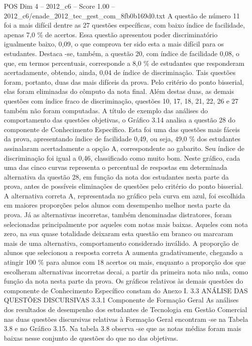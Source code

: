 \begin{textsample}{POS Dim 4 – 2012\_c6 – Score 1.00 – 2012\_c6/enade\_2012\_tec\_gest\_com\_8fb0b169d0.txt}
A questão de número 11 foi a mais difícil dentre as 27 questões específicas, com baixo índice de facilidade, apenas 7,0 \% de acertos.
Essa questão apresentou poder discriminatório igualmente baixo, 0,09, o que comprova ter sido esta a mais difícil para os estudantes.
Destaca -se, também, a questão 20, com índice de facilidade 0,08, o que, em termos percentuais, corresponde a 8,0 \% de estudantes que responderam acertadamente, obtendo, ainda, 0,04 de índice de discriminação.
Tais questões foram, portanto, duas das mais difíceis da prova.
Pelo critério do ponto bisserial, elas foram eliminadas do cômputo da nota final.
Além destas duas, as demais questões com índice fraco de discriminação, questões 10, 17, 18, 21, 22, 26 e 27 também não foram computadas.
A título de exemplo das análises do comportamento das questões objetivas, o Gráfico 3.14 analisa a questão 28 do componente de Conhecimento Específico.
Esta foi uma das questões mais fáceis da prova, apresentando índice de facilidade 0,49, ou seja, 49,0 \% dos estudantes assinalaram acertadamente a opção A, correspondente ao gabarito.
Seu índice de discriminação foi igual a 0,46, classificado como muito bom.
Neste gráfico, cada uma das cinco curvas representa o percentual de respostas em determinada alternativa da questão 28, em função da nota dos estudantes nesta parte da prova, antes de possíveis eliminações de questões pelo critério do ponto bisserial.
A alternativa correta A, representada no gráfico pela curva em azul, foi escolhida em maiores proporções pelos alunos com desempenho melhor nesta parte da prova.
Já as alternativas incorretas, também denominadas distratores, foram selecionadas principalmente por aqueles com notas mais baixas.
Aqueles com nota zero, na sua quase totalidade deixaram esta questão em branco ou marcaram mais de uma alternativa, comportamento considerado inválido.
A proporção de alunos que selecionou a resposta correta A aumenta gradativamente, chegando a atingir 100 \% para alunos com 18 acertos ou mais, enquanto a proporção dos que escolheram alternativas incorretas decai, a partir da primeira nota não nula, como função da nota nesta parte da prova.
Os gráficos relativos às demais questões do componente de Conhecimento Específico constam do Anexo I. 3.3 ANÁLISE DAS QUESTÕES DISCURSIVAS 3.3.1 Componente de Formação Geral As análises dos resultados de desempenho dos estudantes de Tecnologia em Gestão Comercial nas duas questões discursivas relativas à Formação Geral encontram -se na Tabela 3.8 e no Gráfico 3.15.
Na tabela 3.8 observa -se que as notas médias foram mais baixas nesse conjunto de questões do que no das objetivas.

\end{textsample}
